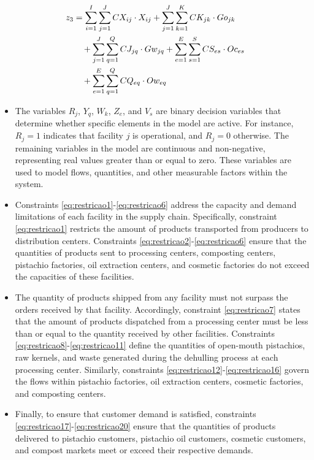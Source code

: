 \documentclass[a4paper]{ifacconf}
\begin{document}
\begin{align}
  z_3 &= \sum_{i=1}^I\sum_{j=1}^J CX_{ij} \cdot X_{ij} 
      + \sum_{j=1}^J\sum_{k=1}^K CK_{jk} \cdot Go_{jk} \notag \\
      &\quad + \sum_{j=1}^J\sum_{q=1}^Q CJ_{jq} \cdot Gw_{jq}
      + \sum_{e=1}^E\sum_{s=1}^S CS_{es} \cdot Oc_{es} \notag \\
      &\quad + \sum_{e=1}^E\sum_{q=1}^Q CQ_{eq} \cdot Ow_{eq}
      \label{eq:custo3}
\end{align}

\begin{itemize}
  \item The variables $R_j$, $Y_q$, $W_k$, $Z_e$, and $V_s$ are binary decision variables that determine whether specific elements in the model are active. For instance, $R_j = 1$ indicates that facility $j$ is operational, and $R_j = 0$ otherwise. The remaining variables in the model are continuous and non-negative, representing real values greater than or equal to zero. These variables are used to model flows, quantities, and other measurable factors within the system.
  
  \item Constraints \eqref{eq:restricao1}-\eqref{eq:restricao6} address the capacity and demand limitations of each facility in the supply chain. Specifically, constraint \eqref{eq:restricao1} restricts the amount of products transported from producers to distribution centers. Constraints \eqref{eq:restricao2}-\eqref{eq:restricao6} ensure that the quantities of products sent to processing centers, composting centers, pistachio factories, oil extraction centers, and cosmetic factories do not exceed the capacities of these facilities.
  
  \item The quantity of products shipped from any facility must not surpass the orders received by that facility. Accordingly, constraint \eqref{eq:restricao7} states that the amount of products dispatched from a processing center must be less than or equal to the quantity received by other facilities. Constraints \eqref{eq:restricao8}-\eqref{eq:restricao11} define the quantities of open-mouth pistachios, raw kernels, and waste generated during the dehulling process at each processing center. Similarly, constraints \eqref{eq:restricao12}-\eqref{eq:restricao16} govern the flows within pistachio factories, oil extraction centers, cosmetic factories, and composting centers.
  
  \item Finally, to ensure that customer demand is satisfied, constraints \eqref{eq:restricao17}-\eqref{eq:restricao20} ensure that the quantities of products delivered to pistachio customers, pistachio oil customers, cosmetic customers, and compost markets meet or exceed their respective demands.
\end{itemize}
\end{document}
